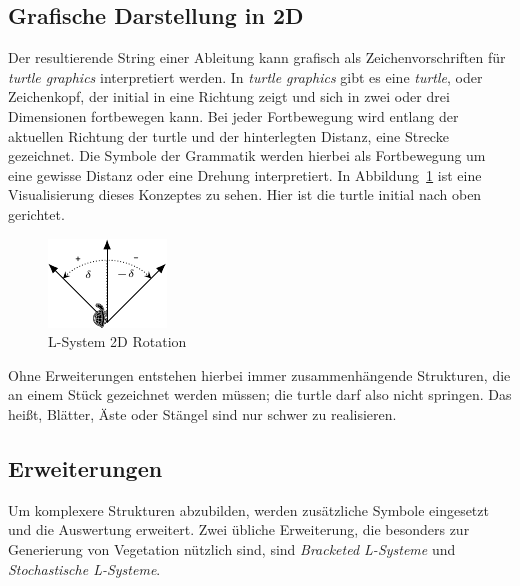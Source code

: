 \subsection{Grafische Darstellung in 2D}
Der resultierende String einer Ableitung kann grafisch als Zeichenvorschriften für \emph{turtle graphics} interpretiert werden.
In \emph{turtle graphics} gibt es eine \emph{turtle}, oder Zeichenkopf, der initial in eine Richtung zeigt und sich in zwei oder drei Dimensionen fortbewegen kann.
Bei jeder Fortbewegung wird entlang der aktuellen Richtung der turtle und der hinterlegten Distanz, eine Strecke gezeichnet.
Die Symbole der Grammatik werden hierbei als Fortbewegung um eine gewisse Distanz oder eine Drehung interpretiert.
In Abbildung~\ref{fig:L-System 2D Rotation} ist eine Visualisierung dieses Konzeptes zu sehen.
Hier ist die turtle initial nach oben gerichtet.

\begin{figure}[ht]
    \centering
    \includegraphics[width=0.5\linewidth]{chapters/02_Grundlagen/L_System/L_System_2D.pdf}
    \caption{L-System 2D Rotation}\label{fig:L-System 2D Rotation}
\end{figure}

Ohne Erweiterungen entstehen hierbei immer zusammenhängende Strukturen, die an einem Stück gezeichnet werden müssen; die turtle darf also nicht springen.
Das heißt, Blätter, Äste oder Stängel sind nur schwer zu realisieren.


\subsection{Erweiterungen}
Um komplexere Strukturen abzubilden, werden zusätzliche Symbole eingesetzt und die Auswertung erweitert.
Zwei übliche Erweiterung, die besonders zur Generierung von Vegetation nützlich sind, sind \emph{Bracketed L-Systeme} und \emph{Stochastische L-Systeme}.


